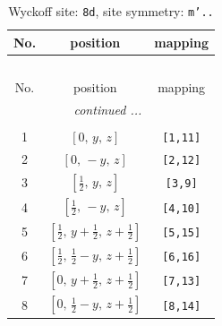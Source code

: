 \documentclass[fleqn,8pt]{jsarticle}
\begin{document}
\begin{longtable}{ccc}
\caption{Wyckoff site: {\tt 8d}, site symmetry: {\tt m'..}}
 \\
 \hline \hline
No. & position & mapping \\ \hline \endfirsthead

\multicolumn{2}{l}{\tablename\ \thetable{}} \\
 \hline \hline
No. & position & mapping \\ \hline \endhead

 \hline \hline
\multicolumn{2}{r}{\footnotesize\it continued ...} \\ \endfoot

 \hline \hline
\multicolumn{2}{r}{} \\ \endlastfoot

1 & $\left[ 0,\, y,\, z \right]$ & {\tt [1,11]} \\ \hline
2 & $\left[ 0,\, - y,\, z \right]$ & {\tt [2,12]} \\ \hline
3 & $\left[ \frac{1}{2},\, y,\, z \right]$ & {\tt [3,9]} \\ \hline
4 & $\left[ \frac{1}{2},\, - y,\, z \right]$ & {\tt [4,10]} \\ \hline
5 & $\left[ \frac{1}{2},\, y + \frac{1}{2},\, z + \frac{1}{2} \right]$ & {\tt [5,15]} \\ \hline
6 & $\left[ \frac{1}{2},\, \frac{1}{2} - y,\, z + \frac{1}{2} \right]$ & {\tt [6,16]} \\ \hline
7 & $\left[ 0,\, y + \frac{1}{2},\, z + \frac{1}{2} \right]$ & {\tt [7,13]} \\ \hline
8 & $\left[ 0,\, \frac{1}{2} - y,\, z + \frac{1}{2} \right]$ & {\tt [8,14]} \\
\end{longtable}
\renewcommand{\arraystretch}{1.2}
\end{document}
